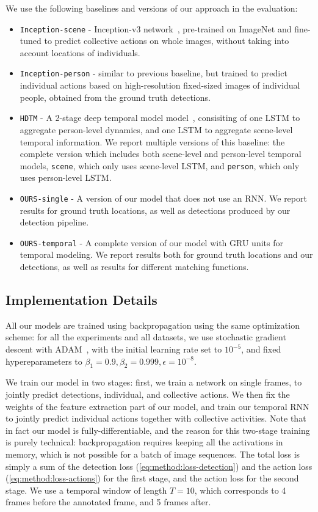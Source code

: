 \documentclass[10pt,twocolumn,letterpaper]{article}
\begin{document}
We use the following baselines and versions of our approach in the evaluation:
\begin{itemize}
\setlength\itemsep{0cm}
\item \texttt{Inception-scene} - Inception-v3 network~\cite{Szegedy2015},
  pre-trained on ImageNet and fine-tuned to predict collective actions on whole
  images, without taking into account locations of individuals.
\item \texttt{Inception-person} - similar to previous baseline, but trained to
  predict individual actions based on high-resolution fixed-sized images of
  individual people, obtained from the ground truth detections.
\item \texttt{HDTM} - A 2-stage deep temporal model model~\cite{Ibrahim2016},
  consisiting of one LSTM to aggregate person-level dynamics, and one LSTM to
  aggregate scene-level temporal information. We report multiple versions of this
  baseline: the complete version which includes both scene-level and person-level 
  temporal models, \texttt{scene}, which only uses scene-level LSTM, 
  and \texttt{person}, which only uses person-level LSTM.
\item \texttt{OURS-single} - A version of our model that does not use an RNN. 
We report results for ground truth locations, as well as detections
  produced by our detection pipeline.
\item \texttt{OURS-temporal} - A complete version of our model with GRU units for
  temporal modeling. We report results both for ground truth locations and our detections,
  as well as results for different matching functions.
\end{itemize}



\subsection{Implementation Details}
\label{sec:evaluation:implementation}

All our models are trained using backpropagation using the same optimization
scheme: for all the experiments and all datasets, we use stochastic gradient descent with
ADAM~\cite{Kingma2014}, with the initial learning rate set to $10^{-5}$, and
fixed hypereparameters to $\beta_1 = 0.9, \beta_2 = 0.999, \epsilon = 10^{-8}$.


We train our model in two stages: first, we train a network on single frames, 
to jointly predict detections, individual, and collective actions. We then fix 
the weights of the feature extraction part of our model, and train our temporal RNN 
to jointly predict individual actions together with collective activities. 
Note that in fact our model is fully-differentiable, and the reason for this 
two-stage training is purely technical: backpropagation requires keeping all the
activations in memory, which is not possible for a batch of image sequences.
The total loss is simply a sum of the detection loss (\ref{eq:method:loss-detection}) 
and the action loss (\ref{eq:method:loss-actions}) for the first stage, and the action
loss for the second stage. We use a temporal window of length $T = 10$, which 
corresponds to 4 frames before the annotated frame, and 5 frames after. 
\end{document}
